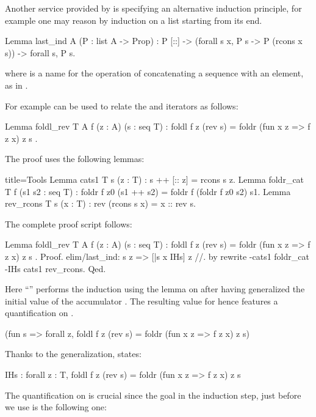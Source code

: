 Another service provided by  is specifying an alternative
induction principle, for example one may reason by induction on
a list starting from its end.

\begin{coq}{}{}
Lemma last_ind A (P : list A -> Prop) :
  P [::] -> (forall s x, P s -> P (rcons x s)) -> forall s, P s.
\end{coq}
where  is a name for the operation of concatenating
a sequence with an element, as in .

For example  can be used to relate the
 and  iterators as follows:

\begin{coq}{}{}
Lemma foldl_rev T A f (z : A) (s : seq T) :
  foldl f z (rev s) = foldr (fun x z => f z x) z s .
\end{coq}

The proof uses the following lemmas:

\begin{coq}{}{title=Tools}
Lemma cats1 T s (z : T) : s ++ [:: z] = rcons s z.
Lemma foldr_cat T f (s1 s2 : seq T) :
  foldr f z0 (s1 ++ s2) = foldr f (foldr f z0 s2) s1.
Lemma rev_rcons T s (x : T) : rev (rcons s x) = x :: rev s.
\end{coq}

The complete proof script follows:

\begin{coq}{}{}
Lemma foldl_rev T A f (z : A) (s : seq T) :
  foldl f z (rev s) = foldr (fun x z => f z x) z s .
Proof.
elim/last_ind: s z => [|s x IHs] z //.
by rewrite -cats1 foldr_cat -IHs cats1 rev_rcons.
Qed.
\end{coq}

Here ``'' performs the induction using the
 lemma on  after having generalized the initial value of
the accumulator .  The resulting value for  hence
features a quantification on .

\begin{coq}{}{}
(fun s => forall z, foldl f z (rev s) = foldr (fun x z => f z x) z s)
\end{coq}

Thanks to the generalization,  states:

\begin{coq}{}{}
IHs : forall z : T, foldl f z (rev s) = foldr (fun x z => f z x) z s
\end{coq}
The quantification on  is crucial since the goal in the induction step,
just before we use  is the following one:

